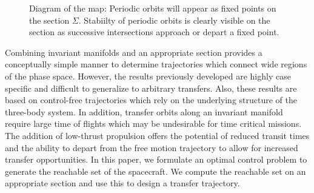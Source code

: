 \documentclass[smallcondensed]{svjour3}
\begin{document}
\begin{figure}
        \centering
        \begin{scaletikzpicturetowidth}{0.5\textwidth}
    \end{scaletikzpicturetowidth}
    \caption{Diagram of the \Poincare map: Periodic orbits will appear as fixed points on the \Poincare section \( \Sigma \). Stabiilty of periodic orbits is clearly visible on the section as successive intersections approach or depart a fixed point.\label{fig:poincare_map}}
\end{figure}

Combining invariant manifolds and an appropriate \Poincare section provides a conceptually simple manner to determine trajectories which connect wide regions of the phase space.
However, the results previously developed are highly case specific and difficult to generalize to arbitrary transfers.
Also, these results are based on control-free trajectories which rely on the underlying structure of the three-body system.
In addition, transfer orbits along an invariant manifold require large time of flights which may be undesirable for time critical missions.
The addition of low-thrust propulsion offers the potential of reduced transit times and the ability to depart from the free motion trajectory to allow for increased transfer opportunities. 
In this paper, we formulate an optimal control problem to generate the reachable set of the spacecraft.
We compute the reachable set on an appropriate \Poincare section and use this to design a transfer trajectory.
\end{document}
